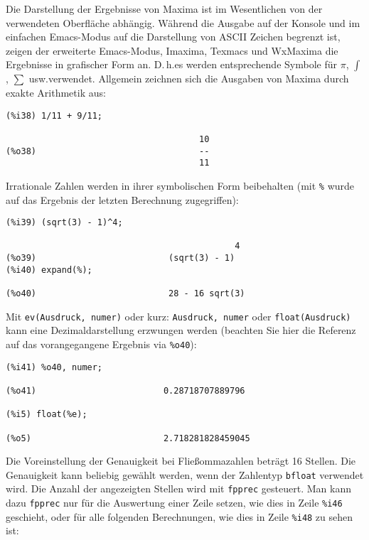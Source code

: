 \documentclass[12pt]{scrartcl}
\begin{document}
Die Darstellung der Ergebnisse von Maxima ist im Wesentlichen von der
verwendeten Oberfläche abhängig. Während die Ausgabe auf der Konsole
und im einfachen Emacs-Modus auf die Darstellung von ASCII Zeichen
begrenzt ist, zeigen der erweiterte Emacs-Modus, Imaxima, Texmacs und
WxMaxima die Ergebnisse in grafischer Form an. D.\,h.\@ es werden
entsprechende Symbole  für $\pi$, $\int$, $\sum$ usw.\@ verwendet.
Allgemein zeichnen sich die Ausgaben von Maxima durch exakte
Arithmetik aus:

\begin{verbatim}
(%i38) 1/11 + 9/11;

                                      10
(%o38)                                --
                                      11
\end{verbatim}

Irrationale Zahlen werden in ihrer symbolischen Form beibehalten (mit
\texttt{\%} wurde auf das Ergebnis der  letzten Berechnung zugegriffen):

\begin{verbatim}
(%i39) (sqrt(3) - 1)^4;

                                             4
(%o39)                          (sqrt(3) - 1)
(%i40) expand(%);

(%o40)                          28 - 16 sqrt(3)
\end{verbatim}

Mit \texttt{ev(Ausdruck, numer)} oder kurz: \texttt{Ausdruck, numer}
oder \texttt{float(Ausdruck)} kann eine Dezimaldarstellung erzwungen
werden (beachten Sie hier die Referenz auf das vorangegangene Ergebnis
via \texttt{\%o40}):

\begin{verbatim}
(%i41) %o40, numer;

(%o41)                         0.28718707889796

(%i5) float(%e);

(%o5)                          2.718281828459045
\end{verbatim}

Die Voreinstellung der Genauigkeit bei Fließommazahlen beträgt 16
Stellen. Die Genauigkeit kann beliebig gewählt werden, wenn der
Zahlentyp \texttt{bfloat} verwendet wird. Die Anzahl der angezeigten
Stellen wird mit \texttt{fpprec} gesteuert. Man kann dazu
\texttt{fpprec} nur für die Auswertung einer Zeile setzen, wie dies in
Zeile \texttt{\%i46} geschieht, oder für alle folgenden Berechnungen,
wie dies in Zeile \texttt{\%i48} zu sehen ist:
\end{document}
